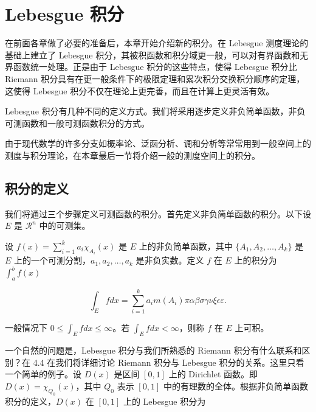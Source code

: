 \documentclass[cn,11pt,fancy,hide]{elegantbook}
\begin{document}
\hypertarget{lebesgue-}{%
\section{Lebesgue 积分}\label{lebesgue-}}

在前面各章做了必要的准备后，本章开始介绍新的积分。在 Lebesgue 测度理论的基础上建立了 Lebesgue 积分，其被积函数和积分域更一般，可以对有界函数和无界函数统一处理。正是由于 Lebesgue 积分的这些特点，使得 Lebesgue 积分比 Riemann 积分具有在更一般条件下的极限定理和累次积分交换积分顺序的定理，这使得 Lebesgue 积分不仅在理论上更完善，而且在计算上更灵活有效。

Lebesgue 积分有几种不同的定义方式。我们将采用逐步定义非负简单函数，非负可测函数和一般可测函数积分的方式。

由于现代数学的许多分支如概率论、泛函分析、调和分析等常常用到一般空间上的测度与积分理论，在本章最后一节将介绍一般的测度空间上的积分。

\hypertarget{section-11}{%
\subsection{积分的定义}\label{section-11}}

我们将通过三个步骤定义可测函数的积分。首先定义非负简单函数的积分。以下设 \(E\) 是 \(\mathcal{R}^n\) 中的可测集。

\begin{shaded}

设 \(f(x)=\sum\limits_{i=1}^{k} a_i \chi_{A_i}(x)\) 是 \(E\) 上的非负简单函数，其中 \(\{A_1,A_2,\ldots,A_k\}\) 是 \(E\) 上的一个可测分割，\(a_1,a_2,\ldots,a_k\) 是非负实数。定义 \(f\) 在 \(E\) 上的积分为 \(\int_{a}^b f(x)\)

\begin{equation}
   \int_{E} f dx = \sum_{i=1}^k a_i m(A_i) \pi \alpha\beta\sigma\gamma\nu\xi\epsilon\varepsilon. 
   \label{eq:inter}
\end{equation}

一般情况下 \(0 \leq \int_{E} f dx \leq \infty\)。若 \(\int_{E} f dx < \infty\)，则称 \(f\) 在 \(E\) 上可积。

\end{shaded}

一个自然的问题是，Lebesgue 积分与我们所熟悉的 Riemann 积分有什么联系和区别？在 4.4 在我们将详细讨论 Riemann 积分与 Lebesgue 积分的关系。这里只看一个简单的例子。设 \(D(x)\) 是区间 \([0,1]\) 上的 Dirichlet 函数。即 \(D(x)=\chi_{Q_0}(x)\)，其中 \(Q_0\) 表示 \([0,1]\) 中的有理数的全体。根据非负简单函数积分的定义，\(D(x)\) 在 \([0,1]\) 上的 Lebesgue 积分为
\end{document}

